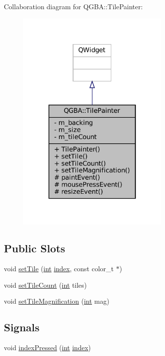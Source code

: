 Collaboration diagram for Q\+G\+BA\+:\+:Tile\+Painter\+:
\nopagebreak
\begin{figure}[H]
\begin{center}
\leavevmode
\includegraphics[width=214pt]{class_q_g_b_a_1_1_tile_painter__coll__graph}
\end{center}
\end{figure}
\subsection*{Public Slots}
\begin{DoxyCompactItemize}
\item 
void \mbox{\hyperlink{class_q_g_b_a_1_1_tile_painter_ac529402c18637da29475a953d28b5d8f}{set\+Tile}} (\mbox{\hyperlink{ioapi_8h_a787fa3cf048117ba7123753c1e74fcd6}{int}} \mbox{\hyperlink{isa-lr35902_8c_ac9ee548085af12859cb52a6c757cf73a}{index}}, const color\+\_\+t $\ast$)
\item 
void \mbox{\hyperlink{class_q_g_b_a_1_1_tile_painter_a7c4854ea34e6557d307a8bcc80c25bc9}{set\+Tile\+Count}} (\mbox{\hyperlink{ioapi_8h_a787fa3cf048117ba7123753c1e74fcd6}{int}} tiles)
\item 
void \mbox{\hyperlink{class_q_g_b_a_1_1_tile_painter_ac9e24d354a3f591c46cd74febeabd682}{set\+Tile\+Magnification}} (\mbox{\hyperlink{ioapi_8h_a787fa3cf048117ba7123753c1e74fcd6}{int}} mag)
\end{DoxyCompactItemize}
\subsection*{Signals}
\begin{DoxyCompactItemize}
\item 
void \mbox{\hyperlink{class_q_g_b_a_1_1_tile_painter_a34b9051af2008b7d2274a5a5d0183b95}{index\+Pressed}} (\mbox{\hyperlink{ioapi_8h_a787fa3cf048117ba7123753c1e74fcd6}{int}} \mbox{\hyperlink{isa-lr35902_8c_ac9ee548085af12859cb52a6c757cf73a}{index}})
\end{DoxyCompactItemize}
